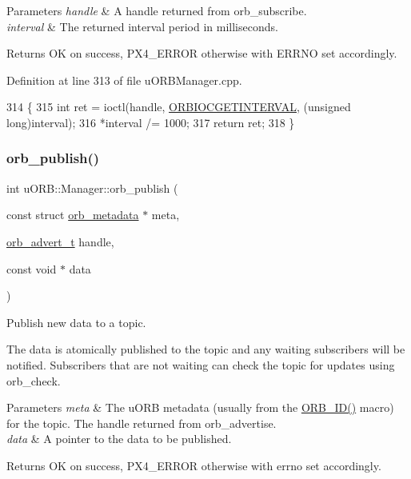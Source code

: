 \begin{DoxyParams}{Parameters}
{\em handle} & A handle returned from orb\+\_\+subscribe. \\
\hline
{\em interval} & The returned interval period in milliseconds. \\
\hline
\end{DoxyParams}
\begin{DoxyReturn}{Returns}
OK on success, P\+X4\+\_\+\+E\+R\+R\+OR otherwise with E\+R\+R\+NO set accordingly. 
\end{DoxyReturn}


Definition at line 313 of file u\+O\+R\+B\+Manager.\+cpp.


\begin{DoxyCode}
314 \{
315     \textcolor{keywordtype}{int} ret = ioctl(handle, \hyperlink{drv__orb__dev_8h_acdbdb0d6f9b8600498ffa2599dca742d}{ORBIOCGETINTERVAL}, (\textcolor{keywordtype}{unsigned} \textcolor{keywordtype}{long})interval);
316     *interval /= 1000;
317     \textcolor{keywordflow}{return} ret;
318 \}
\end{DoxyCode}
\mbox{\label{classuORB_1_1Manager_abbe6966f841886ce3003ebc6d2198447}} 
\subsubsection{\texorpdfstring{orb\+\_\+publish()}{orb\_publish()}}
{\footnotesize\ttfamily int u\+O\+R\+B\+::\+Manager\+::orb\+\_\+publish (\begin{DoxyParamCaption}\item[{const struct \hyperlink{structorb__metadata}{orb\+\_\+metadata} $\ast$}]{meta,  }\item[{\hyperlink{uORB_8h_a8d0cfa5f9ea6427a37057d6cea6dd990}{orb\+\_\+advert\+\_\+t}}]{handle,  }\item[{const void $\ast$}]{data }\end{DoxyParamCaption})}

Publish new data to a topic.

The data is atomically published to the topic and any waiting subscribers will be notified. Subscribers that are not waiting can check the topic for updates using orb\+\_\+check.


\begin{DoxyParams}{Parameters}
{\em meta} & The u\+O\+RB metadata (usually from the \hyperlink{uORB_8h_a96af5434ec1acdf24287bd7851b0413f}{O\+R\+B\+\_\+\+I\+D()} macro) for the topic.  The handle returned from orb\+\_\+advertise. \\
\hline
{\em data} & A pointer to the data to be published. \\
\hline
\end{DoxyParams}
\begin{DoxyReturn}{Returns}
OK on success, P\+X4\+\_\+\+E\+R\+R\+OR otherwise with errno set accordingly. 
\end{DoxyReturn}


